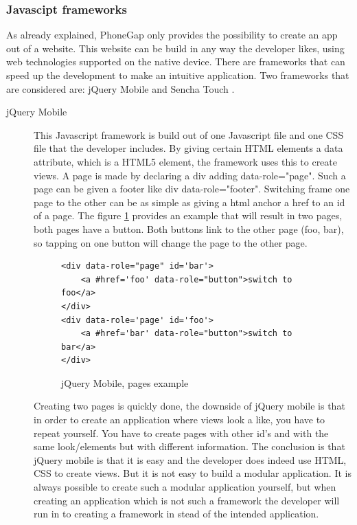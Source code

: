 \subsubsection*{Javascipt frameworks}
As already explained, PhoneGap only provides the possibility to create an app out of a website. This website can be build in any way the developer likes, using web technologies supported on the native device. There are frameworks that can speed up the development to make an intuitive application. Two frameworks that are considered are: jQuery Mobile \cite{jQuery-Mobile} and  Sencha Touch \cite{sencha}. 
\begin{description}
\item [jQuery Mobile]
This Javascript framework is build out of one Javascript file and one CSS file that the developer includes. By giving certain HTML elements a data attribute, which is a HTML5 element, the framework uses this to create views. A page is made by declaring a div adding data-role="page". Such a page can be given a footer like div data-role="footer". 
Switching frame one page to the other can be as simple as giving a html anchor a href to an id of a page. The figure \ref{fig:jquery} provides an example that will result in two pages, both pages have a button. Both buttons link to the other page (foo, bar), so tapping on one button will change the page to the other page.
\begin{figure}
\begin{lstlisting}
<div data-role="page" id='bar'>
	<a #href='foo' data-role="button">switch to foo</a>
</div>
<div data-role='page' id='foo'>
	<a #href='bar' data-role="button">switch to bar</a>
</div>
\end{lstlisting}
\caption{jQuery Mobile, pages example}
\label{fig:jquery}
\end{figure}

Creating two pages is quickly done, the downside of jQuery mobile is that in order to create an application where views look a like, you have to repeat yourself. You have to create pages with other id's and with the same look/elements but with different information. The conclusion is that jQuery mobile is that it is easy and the developer does indeed use HTML, CSS to create views.  But it is not easy to build a modular application. It is always possible to create such a modular application yourself, but when creating an application which is not such a framework the developer will run in to creating a framework in stead of the intended application.


\end{description}
